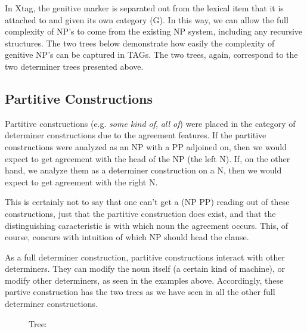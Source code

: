 In Xtag, the genitive marker is separated out from the lexical item that it is
attached to and given its own category (G).  In this way, we can allow the full
complexity of NP's to come from the existing NP system, including any recursive
structures.  The two trees below demonstrate how easily the complexity of
genitive NP's can be captured in TAGs.  The two trees, again, correspond to the two
determiner trees presented above.




\subsection{Partitive Constructions}

Partitive constructions (e.g. {\it  some kind of}, {\it all of\/}) were placed in the category
of determiner constructions due to the agreement features.  If the partitive
constructions were analyzed as an NP with a PP adjoined on, then we would
expect to get agreement with the head of the NP (the left N).  If, on the other hand, we
analyze them as a determiner construction on a N, then we would expect to get
agreement with the right N.


This is certainly not to say that one can't get a (NP PP) reading out of these
constructions, just that the partitive construction does exist, and that the
distinguishing caracteristic is with which noun the agreement occurs.  This,
of course, concurs with intuition of which NP should head the clause.


As a full determiner construction, partitive constructions interact with other
determiners.  They can modify the noun itself (a certain kind of machine), or
modify other determiners, as seen in the examples above.  Accordingly, these
partive construction has the two trees as we have seen in all the other full
determiner constructions.


\begin{figure}[ht]
\centering
{}
\caption{ Tree: }
\end{figure}

